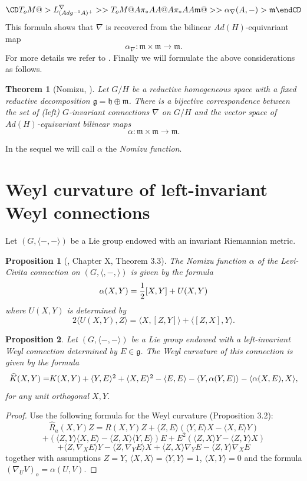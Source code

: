 \documentclass[12pt]{article}
\newtheorem{theorem}{Theorem}
\newtheorem{proposition}{Proposition}
\begin{document}
$$
\CD
T_oM @>{L^{\nabla}_{(Ad g^{-1}A)^+}}>> T_oM\\
@A{\pi_*}AA @A{\pi_*}AA\\
\mathfrak{m} @>>{\alpha_{\nabla}(A,-)}> \mathfrak{m}
\endCD
$$
This formula shows that $\nabla$ is recovered from the bilinear $Ad(H)$-equivariant map 
$$\alpha_{\nabla}:\mathfrak{m}\times\mathfrak{m}\rightarrow \mathfrak{m}.$$
For more details we refer to \cite{DGP}.
Finally we will formulate the above considerations as follows.
\begin{theorem}[Nomizu, \cite{N}] Let $G/H$ be a reductive homogeneous space with a fixed reductive decomposition $\mathfrak{g}=\mathfrak{h}\oplus\mathfrak{m}$. There is a bijective correspondence between the set of (left) $G$-invariant connections $\nabla$ on $G/H$ and the vector space of $Ad(H)$-equivariant  bilinear maps 
$$\alpha:\mathfrak{m}\times\mathfrak{m}\rightarrow\mathfrak{m}.$$
\end{theorem}
\noindent In the sequel we will call $\alpha$ the {\it Nomizu function}.


\section{Weyl curvature of left-invariant Weyl connections}
Let $(G,\langle -,-\rangle)$ be a Lie group endowed with an invariant Riemannian metric.
\begin{proposition}[\cite{KN}, Chapter X, Theorem 3.3]\label{prop:KN-LC} The Nomizu function $\alpha$ of the Levi-Civita connection on $(G,\langle,-,\rangle)$ is given by the formula
$$\alpha(X,Y)={1\over 2}[X,Y]+U(X,Y)$$
where $U(X,Y)$ is determined by
$$2\langle U(X,Y),Z\rangle=\langle X,[Z,Y]\rangle+\langle [Z,X],Y\rangle.$$
\end{proposition}
\begin{proposition}\label{prop:hat-k} Let $(G,\langle -,-\rangle)$ be a Lie group endowed with a left-invariant Weyl connection determined by $E\in\mathfrak{g}$. The Weyl curvature of this connection is given by the formula
 \begin{equation}\widehat{K}(X,Y) =$$
$$ K(X,Y)  + \langle {Y},{E}\rangle^2 + \langle {X},{E}\rangle^2 - \langle{E},{E}\rangle - \langle{Y},{\alpha(Y,E)}\rangle  - \langle{\alpha(X,E)},{X}\rangle,
\end{equation}
for any unit orthogonal $X,Y$.
\end{proposition}
\begin{proof} Use the following formula for the Weyl curvature \cite{W} (Proposition 3.2):
$$\widehat{R}_a(X,Y)Z=R(X,Y)Z+\langle Z,E\rangle(\langle Y,E\rangle X-\langle X,E\rangle Y)$$
$$+(\langle Z,Y\rangle \langle X,E\rangle-\langle Z,X\rangle\langle Y,E\rangle)E+E^2(\langle Z,X\rangle Y-\langle Z,Y\rangle X)$$
$$+\langle Z,\nabla_XE\rangle Y-\langle Z,\nabla_YE\rangle X+\langle Z,X\rangle\nabla_YE-\langle Z,Y\rangle\nabla_XE$$ 
  together with assumptions $Z=Y$, $\langle X,X\rangle=\langle Y,Y\rangle=1$, $\langle X,Y\rangle=0$ and the formula $(\nabla_UV)_o=\alpha(U,V)$.
\end{proof}
\end{document}
